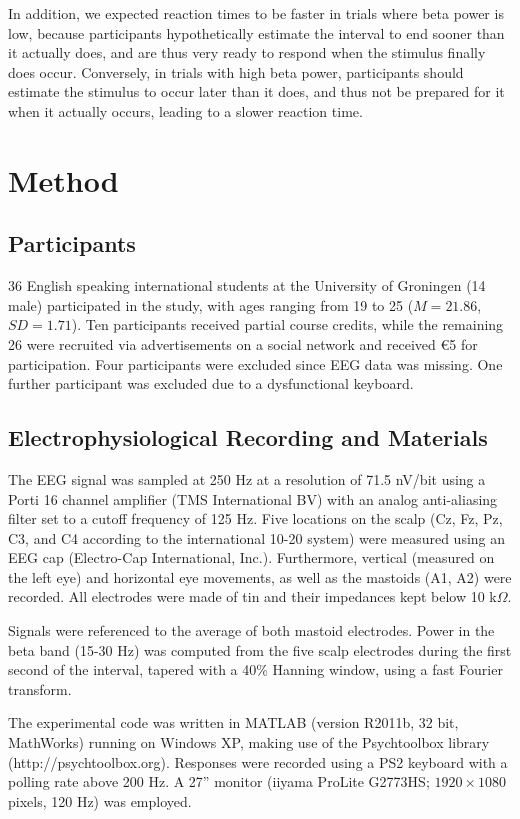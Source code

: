 \documentclass[man,floatsintext]{apa6} %
\begin{document}
In addition, we expected reaction times to be faster in trials where
beta power is low, because participants hypothetically estimate the
interval to end sooner than it actually does, and are thus very ready
to respond when the stimulus finally does occur.  Conversely, in
trials with high beta power, participants should estimate the stimulus
to occur later than it does, and thus not be prepared for it when it
actually occurs, leading to a slower reaction time.

\section{Method}
\subsection{Participants}
36 English speaking international students at the University of
Groningen (14 male) participated in the study, with ages ranging from
19 to 25 ($M = 21.86$, $SD = 1.71$). Ten participants received partial
course credits, while the remaining 26 were recruited via
advertisements on a social network and received \euro 5 for
participation. Four participants were excluded since EEG data was
missing. One further participant was excluded due to a dysfunctional
keyboard.

\subsection{Electrophysiological Recording and Materials}
The EEG signal was sampled at 250 Hz at a resolution of 71.5 nV/bit
using a Porti 16 channel amplifier (TMS International BV) with an
analog anti-aliasing filter set to a cutoff frequency of 125 Hz. Five
locations on the scalp (Cz, Fz, Pz, C3, and C4 according to the
international 10-20 system) were measured using an EEG cap
(Electro-Cap International, Inc.). Furthermore, vertical (measured on
the left eye) and horizontal eye movements, as well as the mastoids
(A1, A2) were recorded. All electrodes were made of tin and their
impedances kept below 10 k$\Omega$.

Signals were referenced to the average of both mastoid
electrodes. Power in the beta band (15-30 Hz) was computed from the
five scalp electrodes during the first second of the interval, tapered
with a 40\% Hanning window, using a fast Fourier transform.

The experimental code was written in MATLAB (version R2011b, 32 bit,
MathWorks) running on Windows XP, making use of the Psychtoolbox
library (http://psychtoolbox.org). Responses were recorded using a PS2
keyboard with a polling rate above 200 Hz. A 27'' monitor (iiyama
ProLite G2773HS; $1920 \times 1080$ pixels, 120 Hz) was employed.
\end{document}
